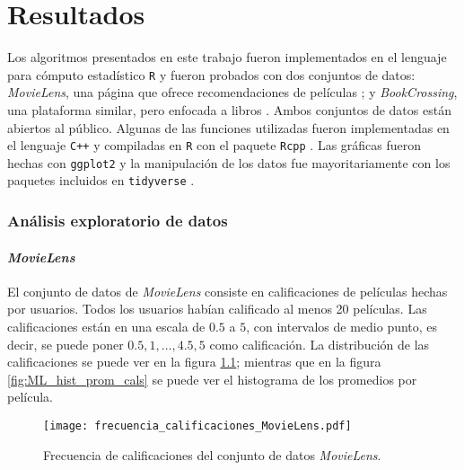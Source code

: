 
\chapter{Resultados}
\label{ch:resultados}

Los algoritmos presentados en este trabajo fueron implementados en el lenguaje para cómputo estadístico \texttt{R} \cite{R_manual} y fueron probados con dos conjuntos de datos: \textit{MovieLens}, una página que ofrece recomendaciones de películas \cite{harper2016movielens}; y \textit{BookCrossing}, una plataforma similar, pero enfocada a libros \cite{ziegler2005improving}. Ambos conjuntos de datos están abiertos al público. Algunas de las funciones utilizadas fueron implementadas en el lenguaje \texttt{C++} y compiladas en \texttt{R} con el paquete \texttt{Rcpp} \cite{Rcpp_Book_Eddelbuettel} \cite{Rcpp_Article_Eddelbuettel_Francois}. Las gráficas fueron hechas con \texttt{ggplot2} \cite{wickham_ggplot2} y la manipulación de los datos fue mayoritariamente con los paquetes incluidos en \texttt{tidyverse} \cite{wickham_tidyverse}.

\subsection{Análisis exploratorio de datos}


\subsubsection{\textit{MovieLens}}

El conjunto de datos de \textit{MovieLens} consiste en  calificaciones de  películas hechas por  usuarios. Todos los usuarios habían calificado al menos 20 películas. Las calificaciones están en una escala de $0.5$ a $5$, con intervalos de medio punto, es decir, se puede poner $0.5, 1, \hdots, 4.5, 5$ como calificación. La distribución de las calificaciones se puede ver en la figura \ref{fig:ML_frec_calificaciones}; mientras que en la figura \ref{fig:ML_hist_prom_cals} se puede ver el histograma de los promedios por película.

\begin{figure}[H]
	\centering
 	\texttt{[image: frecuencia\_calificaciones\_MovieLens.pdf]}
 	\caption{Frecuencia de calificaciones del conjunto de datos \textit{MovieLens}.}
 	\label{fig:ML_frec_calificaciones}
\end{figure}

